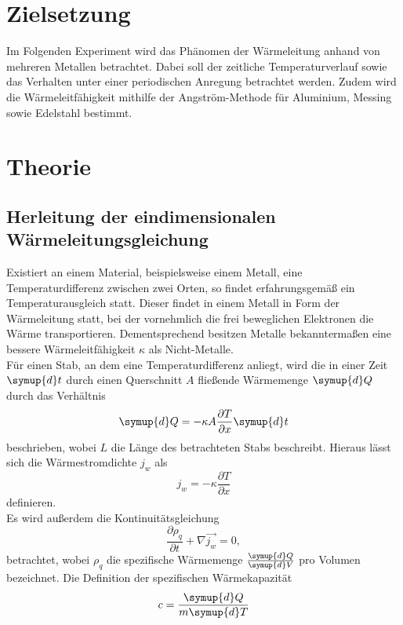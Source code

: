 \section{Zielsetzung}
Im Folgenden Experiment wird das Phänomen der Wärmeleitung anhand von mehreren Metallen betrachtet.
Dabei soll der zeitliche Temperaturverlauf sowie das Verhalten unter einer periodischen Anregung betrachtet werden.
Zudem wird die Wärmeleitfähigkeit mithilfe der Angström-Methode für Aluminium, Messing sowie Edelstahl bestimmt.

\section{Theorie}
\subsection{Herleitung der eindimensionalen Wärmeleitungsgleichung}
Existiert an einem Material, beispielsweise einem Metall, eine Temperaturdifferenz zwischen zwei Orten, so findet erfahrungsgemäß ein Temperaturausgleich statt.
Dieser findet in einem Metall in Form der Wärmeleitung statt, bei der vornehmlich die frei beweglichen Elektronen die Wärme transportieren.
Dementsprechend besitzen Metalle bekanntermaßen eine bessere Wärmeleitfähigkeit $\kappa$ als Nicht-Metalle.\\
Für einen Stab, an dem eine Temperaturdifferenz anliegt, wird die in einer Zeit $\symup{d}t$ durch einen Querschnitt $A$ fließende Wärmemenge $\symup{d}Q$ durch das Verhältnis
\begin{equation}
  \symup{d}Q = - \kappa A \frac{\partial T}{\partial x} \symup{d}t
  \label{eqn:w}
\end{equation}
beschrieben, wobei $L$ die Länge des betrachteten Stabs beschreibt.
Hieraus lässt sich die Wärmestromdichte $j_w$ als
\begin{equation}
  j_w = - \kappa \frac{\partial T}{\partial x}
\end{equation}
definieren.\\
Es wird außerdem die Kontinuitätsgleichung
\begin{equation}
  \frac{\partial \rho_q}{\partial t} + \nabla \vec{j_w} = 0,
\end{equation}
betrachtet, wobei $\rho_q$ die spezifische Wärmemenge $\frac{\symup{d}Q}{\symup{d}V}$ pro Volumen bezeichnet.
Die Definition der spezifischen Wärmekapazität
\begin{equation}
  c = \frac{\symup{d}Q}{m \symup{d}T}
\end{equation}
